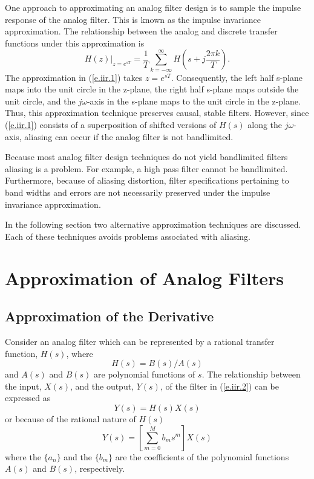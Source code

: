 	One approach to approximating an analog
filter design is to sample the impulse response
of the analog filter.  This is known as the impulse invariance
approximation.  The relationship between
the analog and discrete transfer functions under this approximation is
%
\begin{equation}
H(z)|_{z=e^{sT}}=\frac{1}{T}\sum_{k=-\infty}^{\infty}H(s+j\frac{2\pi k}{T}).
\label{e.iir.1}
\end{equation}
%
The approximation in (\ref{e.iir.1}) takes $z=e^{sT}$.  Consequently,
the left half s-plane maps into the unit circle in the
z-plane, the right half s-plane maps outside the
unit circle, and the $j\omega$-axis in the s-plane maps 
to the unit circle in the z-plane.  Thus,
this approximation technique preserves causal, stable
filters.  However, since (\ref{e.iir.1}) consists of a superposition
of shifted versions of $H(s)$ along the $j\omega$-axis,
aliasing can occur if the analog filter is not bandlimited.

	Because most analog filter design techniques
do not yield bandlimited filters aliasing is a problem.
For example, a high pass filter cannot be bandlimited.  Furthermore,
because of aliasing distortion, filter specifications pertaining
to band widths and errors are not necessarily preserved under the
impulse invariance approximation.

	In the following section two alternative
approximation techniques are discussed.  Each of these techniques avoids 
problems associated with aliasing.
\section{Approximation of Analog Filters}
\subsection{Approximation of the Derivative}

	Consider an analog filter which can be 
represented by a rational transfer function, $H(s)$,
where
%
\begin{equation}
H(s)=B(s)/A(s)
\label{e.iir.2}
\end{equation}
%
and $A(s)$ and $B(s)$ are polynomial functions of $s$.
The relationship between the input, $X(s)$, and the output,
$Y(s)$, of the filter in (\ref{e.iir.2}) can be expressed as
%
\begin{equation}
Y(s)=H(s)X(s)
\label{e.iir.3}
\end{equation}
%
or because of the rational nature of $H(s)$
%
\begin{equation}
[\sum_{n=0}^{N}a_ns^n]Y(s)=[\sum_{m=0}^{M}b_ms^m]X(s)
\label{e.iir.4}
\end{equation}
%
where the $\{a_n\}$ and the $\{b_m\}$ are the coefficients of the
polynomial functions $A(s)$ and $B(s)$, respectively.

